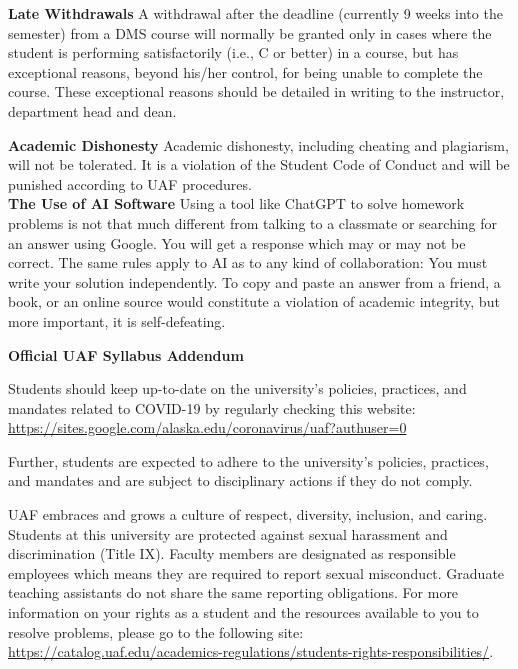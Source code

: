 \documentclass[12pt]{article}
\begin{document}
\textbf{Late Withdrawals} 
A withdrawal after the deadline (currently 9 weeks into the semester) from a DMS course will normally be granted only in cases where the student is performing satisfactorily (i.e., C or better) in a course, but has exceptional reasons, beyond his/her control, for being unable to complete the course. These exceptional reasons should be detailed in writing to the instructor, department head and dean.

\textbf{Academic Dishonesty}
Academic dishonesty, including cheating and plagiarism, will not
be tolerated.  It is a violation of the Student Code of Conduct
and will be punished according to UAF procedures.\\

\textbf{The Use of AI Software}
Using a tool like ChatGPT to solve homework problems is not that much different from talking to a classmate or searching for an answer using Google. You will get a response which may or may not be correct. The same rules apply to AI as to any kind of collaboration: You must write your solution independently. To copy and paste an answer from a friend, a book, or an online source would constitute a violation of academic integrity, but more important, it is self-defeating.

\hfill

\textbf{\large{Official UAF Syllabus Addendum}}
 
\hfill

 Students should keep up-to-date on the university's policies, practices, and mandates related to COVID-19 by regularly checking this website: \url{https://sites.google.com/alaska.edu/coronavirus/uaf?authuser=0}

Further, students are expected to adhere to the university's policies, practices, and mandates and are subject to disciplinary actions if they do not comply.

 UAF embraces and grows a culture of respect, diversity, inclusion, and caring. Students at this university are protected against sexual harassment and discrimination (Title IX). Faculty members are designated as responsible employees which means they are required to report sexual misconduct. Graduate teaching assistants do not share the same reporting obligations. For more information on your rights as a student and the resources available to you to resolve problems, please go to the following site: \url{https://catalog.uaf.edu/academics-regulations/students-rights-responsibilities/}.
\end{document}
